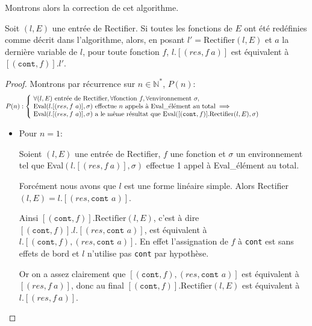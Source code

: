 Montrons alors la correction de cet algorithme.

\begin{proposition}
    Soit $(l, E)$ une entrée de Rectifier. Si toutes les fonctions de $E$ ont
    été redéfinies comme décrit dans l'algorithme, alors, en posant
    $l' = \text{Rectifier}(l, E)$ et $a$ la dernière variable de $l$, pour toute
    fonction $f$, $l.[(res, f\ a)]$ est équivalent à $[(\texttt{cont}, f)].l'$.
\end{proposition}

\begin{proof}
    Montrons par récurrence sur $n \in \mathbb{N}^*$, $P(n)$:
    $$
        P(n): \left \{ \ \parbox{415pt}{$\forall (l, E) \text{ entrée de Rectifier}, \forall \text{fonction } f, \forall \text{environnement } \sigma, \\
                \text{Eval}(l.[(res, f\ a)], \sigma) \text{ effectue } n \text{ appels à Eval\_élément au total} \implies \\
                \text{Eval}(l.[(res, f\ a)], \sigma) \text{ a le même résultat que } \text{Eval}([(\texttt{cont}, f)].\text{Rectifier}(l, E), \sigma)$} \right .
    $$

    \begin{itemize}
        \item Pour $n = 1$:

              Soient $(l, E)$ une entrée de Rectifier, $f$ une fonction et
              $\sigma$ un environnement tel que Eval$(l.[(res, f\ a)], \sigma)$
              effectue 1 appel à Eval\_élément au total.

              \bigskip

              Forcément nous avons que $l$ est une forme linéaire simple. Alors
              Rectifier$(l, E) = l.[(res, \texttt{cont } a)]$.

              \bigskip

              Ainsi $[(\texttt{cont}, f)].\text{Rectifier}(l, E)$, c'est à dire
              $[(\texttt{cont}, f)].l.[(res, \texttt{cont } a)]$, est équivalent
              à $l.[(\texttt{cont}, f), (res, \texttt{cont } a)]$. En
              effet l'assignation de $f$ à \texttt{cont} est sans effets de bord
              et $l$ n'utilise pas \texttt{cont} par hypothèse.

              \bigskip

              Or on a assez clairement que $[(\texttt{cont}, f), (res, \texttt{cont } a)]$
              est équivalent à $[(res, f\ a)]$, donc au final
              $[(\texttt{cont}, f)].\text{Rectifier}(l, E)$ est équivalent à
              $l.[(res, f\ a)]$.


\end{itemize}
\end{proof}
